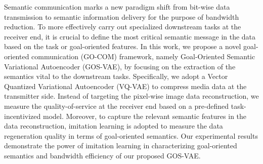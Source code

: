 %
Semantic communication marks a new paradigm shift from 
bit-wise data transmission to semantic 
information delivery for the purpose of bandwidth reduction. To more effectively carry out specialized downstream tasks at the receiver end, it is crucial to define the most critical semantic message in the data based on the task or goal-oriented features.
In this work, we propose a novel goal-oriented communication (GO-COM) framework, namely Goal-Oriented Semantic Variational Autoencoder (GOS-VAE), by focusing on the extraction of the semantics vital to the downstream tasks. Specifically, 
we adopt a Vector Quantized Variational Autoencoder (VQ-VAE) to compress media data at the transmitter side. Instead of targeting the pixel-wise image data reconstruction, we measure the quality-of-service at the receiver end based on
a pre-defined task-incentivized model. Moreover, to capture the relevant semantic features in the data reconstruction, imitation learning is adopted to measure the data regeneration quality in terms of
goal-oriented semantics. Our experimental results 
demonstrate the power of imitation learning in characterizing goal-oriented semantics and bandwidth efficiency of our proposed GOS-VAE.

%